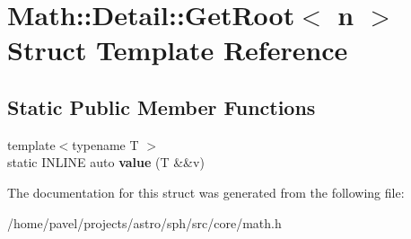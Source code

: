 \hypertarget{structMath_1_1Detail_1_1GetRoot}{}\section{Math\+:\+:Detail\+:\+:Get\+Root$<$ n $>$ Struct Template Reference}
\label{structMath_1_1Detail_1_1GetRoot}
\subsection*{Static Public Member Functions}
\begin{DoxyCompactItemize}
\item 
\hypertarget{structMath_1_1Detail_1_1GetRoot_a22395bab182863940335af3852383736}{}\label{structMath_1_1Detail_1_1GetRoot_a22395bab182863940335af3852383736} 
{\footnotesize template$<$typename T $>$ }\\static I\+N\+L\+I\+NE auto {\bfseries value} (T \&\&v)
\end{DoxyCompactItemize}


The documentation for this struct was generated from the following file\+:\begin{DoxyCompactItemize}
\item 
/home/pavel/projects/astro/sph/src/core/math.\+h\end{DoxyCompactItemize}
